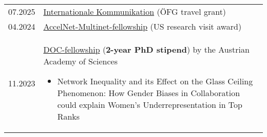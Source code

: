 
\begin{longtable}[l]{@{}p{} p{}}
    07.2025 & \href{https://www.oefg.at/foerderungen/internationale-kommunikation/}{Internationale Kommunikation} (\"OFG travel grant)\\
    04.2024 & \href{https://www.accelnet-multinet.org/}{AccelNet-Multinet-fellowship} (US research visit award)\\
    11.2023 & \href{https://stipendien.oeaw.ac.at/en/fellowships/doc}{DOC-fellowship} (\textbf{2-year PhD stipend}) by the Austrian Academy of Sciences
    \begin{itemize}
        \item \raggedright Network Inequality and its Effect on the Glass Ceiling Phenomenon: How Gender Biases in Collaboration could explain Women’s Underrepresentation in Top Ranks
    \end{itemize}

\end{longtable}
